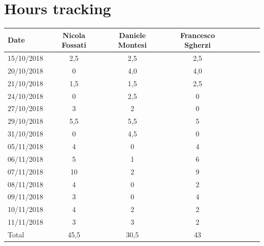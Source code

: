 \documentclass[a4paper,oneside,11pt]{article}
\begin{document}
        \section{Hours tracking}
        \begin{tabular}{l*{6}{c}r}
            Date & Nicola Fossati & Daniele Montesi & Francesco Sgherzi \\
            \hline
            15/10/2018 & 2,5 & 2,5 & 2,5   \\
            \hline
            20/10/2018 & 0 & 4,0 & 4,0 \\
            \hline
            21/10/2018 & 1,5 & 1,5 & 2,5 \\
            \hline
            24/10/2018 & 0 & 2,5 & 0 \\
             \hline
            27/10/2018 & 3 & 2 & 0 \\
             \hline
            29/10/2018 & 5,5 & 5,5 & 5 \\
             \hline
            31/10/2018 & 0 & 4,5 & 0 \\
             \hline
            05/11/2018 & 4 & 0 & 4 \\
            \hline
            06/11/2018 & 5 & 1 & 6 \\
            \hline
            07/11/2018 & 10 & 2 & 9 \\
             \hline
            08/11/2018 & 4 & 0 & 2 \\
            \hline
            09/11/2018 & 3 & 0 & 4 \\
            \hline
            10/11/2018 & 4 & 2 & 2 \\
            \hline
            11/11/2018 & 3 & 3 & 2 \\   
            \hline
            Total & 45,5 & 30,5 & 43 \\  


        \end{tabular}
\end{document}
